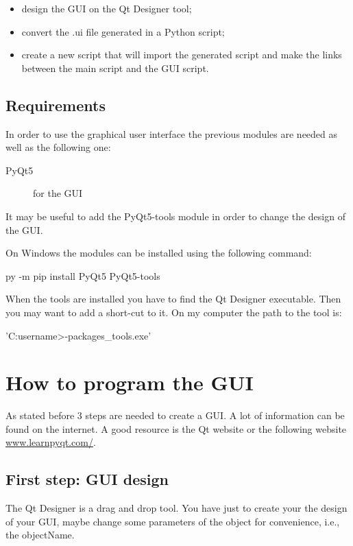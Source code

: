 \documentclass[english, 12 pt, openany, oneside]{book}
\begin{document}
\begin{itemize}
\item design the GUI on the Qt Designer tool;
\item convert the .ui file generated in a Python script;
\item create a new script that will import the generated script and make the links between the main script and the GUI script.
\end{itemize}

\subsection{Requirements}
In order to use the graphical user interface the previous modules are needed as well as the following one:

\begin{description}
\item[PyQt5] for the GUI
\end{description}

It may be useful to add the PyQt5-tools module in order to change the design of the GUI.

On Windows the modules can be installed using the following command:
\begin{pyverbatim}
py -m pip install PyQt5 PyQt5-tools
\end{pyverbatim}

When the tools are installed you have to find the Qt Designer executable. Then you may want to add a short-cut to it. On my computer the path to the tool is:
\begin{pyverbatim}[][breaklines]
'C:\Users\<username>\AppData\Local\Programs\Python{}\Lib\site-packages_tools\Qt\bin\designer.exe'
\end{pyverbatim}

\section{How to program the GUI}
As stated before 3 steps are needed to create a GUI. A lot of information can be found on the internet. A good resource is the Qt website or the following website \url{www.learnpyqt.com/}.

\subsection{First step: GUI design}
The Qt Designer is a drag and drop tool. You have just to create your the design of your GUI, maybe change some parameters of the object for convenience, i.e., the objectName.
\end{document}
